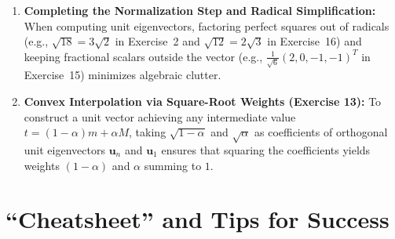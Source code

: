 \documentclass[11pt, letterpaper]{article}
\theoremstyle{definition}
\theoremstyle{remark}
\begin{document}
\begin{enumerate}[label=\textbf{\arabic*.}]
    \item \textbf{Completing the Normalization Step and Radical Simplification:}
    When computing unit eigenvectors, factoring perfect squares out of radicals (e.g., $\sqrt{18} = 3\sqrt{2}$ in Exercise~2 and $\sqrt{12} = 2\sqrt{3}$ in Exercise~16) and keeping fractional scalars outside the vector (e.g., $\frac{1}{\sqrt{6}}(2,0,-1,-1)^T$ in Exercise~15) minimizes algebraic clutter.

    \item \textbf{Convex Interpolation via Square-Root Weights (Exercise 13):}
    To construct a unit vector achieving any intermediate value $t = (1-\alpha)m + \alpha M$, taking $\sqrt{1-\alpha}$ and $\sqrt{\alpha}$ as coefficients of orthogonal unit eigenvectors $\mathbf{u}_n$ and $\mathbf{u}_1$ ensures that squaring the coefficients yields weights $(1-\alpha)$ and $\alpha$ summing to $1$.
\end{enumerate}

\section{``Cheatsheet'' and Tips for Success}
\end{document}
